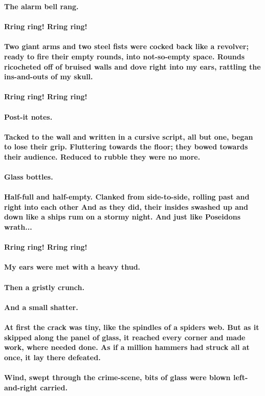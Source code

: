 \documentclass{book}
\begin{document}
	\newpage
	\Large{\textbf{The alarm bell rang.\\\\
				   Rring ring! Rring ring!\\\\
                   Two giant arms and two steel fists were cocked back like a revolver;
				   ready to fire their empty rounds, into not-so-empty space.
				   Rounds ricocheted off of bruised walls and dove right into my ears,
				   rattling the ins-and-outs of my skull.\\\\
				   Rring ring! Rring ring!\\\\
				   Post-it notes.\\\\
				   Tacked to the wall and written in a cursive script, all but one, began to lose their grip.
				   Fluttering towards the floor; they bowed towards their audience. Reduced to rubble they were no more. \\\\
				   Glass bottles.\\\\
				   Half-full and half-empty.
				   Clanked from side-to-side, rolling past and right into each other
				   And as they did, their insides swashed up and down like a ships rum on a stormy night.
				   And just like Poseidons wrath...\\\\
				   Rring ring! Rring ring!\\\\
				   My ears were met with a heavy thud.\\\\
				   Then a gristly crunch.\\\\
				   And a small shatter.\\\\
				   At first the crack was tiny, like the spindles of a spiders web.
				   But as it skipped along the panel of glass, it reached every corner
				   and made work, where needed done.
				   As if a million hammers had struck all at once, it lay there defeated.\\\\
				   Wind, swept through the crime-scene, bits of glass were blown left-and-right carried.\\\\
}}
\end{document}
